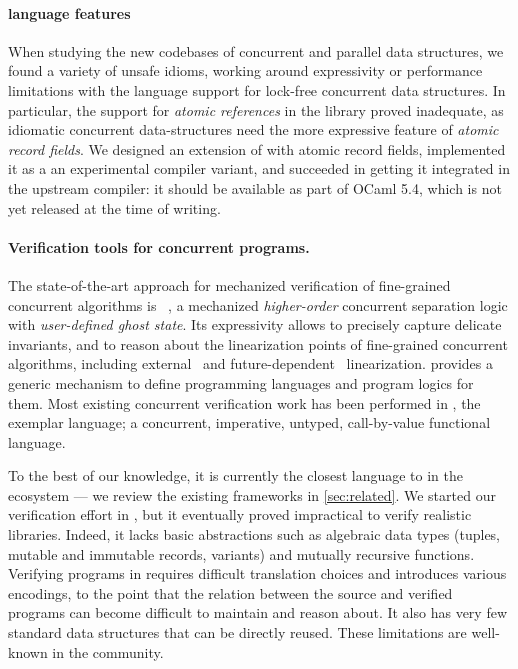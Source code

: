 \paragraph{\OCaml language features} When studying the new codebases
of concurrent and parallel data structures, we found a variety of
unsafe idioms, working around expressivity or performance limitations
with the \OCaml language support for lock-free concurrent data
structures. In particular, the support for \emph{atomic references} in
the \OCaml library proved inadequate, as idiomatic concurrent
data-structures need the more expressive feature of \emph{atomic
  record fields}. We designed an extension of \OCaml with atomic
record fields, implemented it as a an experimental compiler variant,
and succeeded in getting it integrated in the upstream \OCaml
compiler: it should be available as part of OCaml 5.4, which is not
yet released at the time of writing.

\paragraph{Verification tools for concurrent programs.} The state-of-the-art approach for mechanized verification of fine-grained concurrent algorithms is \Iris~\citep*{DBLP:journals/jfp/JungKJBBD18}, a mechanized \emph{higher-order} concurrent separation logic with \emph{user-defined ghost state}. Its expressivity allows to precisely capture delicate invariants, and to reason about the linearization points of fine-grained concurrent algorithms, including external~\citep*{DBLP:conf/cpp/VindumFB22} and future-dependent~\citep*{DBLP:journals/pacmpl/JungLPRTDJ20,DBLP:conf/cpp/VindumB21,DBLP:conf/osdi/Chang0STKZ23} linearization. \Iris provides a generic mechanism to define programming languages and program logics for them. Most existing \Iris concurrent verification work has been performed in \HeapLang, the exemplar \Iris language; a concurrent, imperative, untyped, call-by-value functional language.

To the best of our knowledge, it is currently the closest language to \OCamlFive in the \Iris ecosystem --- we review the existing frameworks in \cref{sec:related}. We started our verification effort in \HeapLang, but it eventually proved impractical to verify realistic \OCaml libraries.
Indeed, it lacks basic abstractions such as algebraic data types (tuples, mutable and immutable records, variants) and mutually recursive functions.
Verifying \OCaml programs in \HeapLang requires difficult translation choices and introduces various encodings, to the point that the relation between the source and verified programs can become difficult to maintain and reason about.
It also has very few standard data structures that can be directly reused.
These limitations are well-known in the \Iris community.

